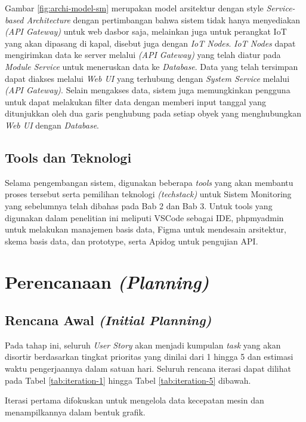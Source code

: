 Gambar \ref{fig:archi-model-sm} merupakan model arsitektur dengan style \textit{Service-based Architecture} dengan pertimbangan bahwa sistem tidak hanya menyediakan \textit{(API Gateway)} untuk web dasbor saja, melainkan juga untuk perangkat IoT yang akan dipasang di kapal, disebut juga dengan \textit{IoT Nodes}. \textit{IoT Nodes} dapat mengirimkan data ke server melalui \textit{(API Gateway)} yang telah diatur pada \textit{Module Service} untuk meneruskan data ke \textit{Database}. Data yang telah tersimpan dapat diakses melalui \textit{Web UI} yang terhubung dengan \textit{System Service} melalui \textit{(API Gateway)}. Selain mengakses data, sistem juga memungkinkan pengguna untuk dapat melakukan filter data dengan memberi input tanggal yang ditunjukkan oleh dua garis penghubung pada setiap obyek yang menghubungkan \textit{Web UI} dengan \textit{Database}.

\subsection{Tools dan Teknologi}

Selama pengembangan sistem, digunakan beberapa \textit{tools} yang akan membantu proses tersebut serta pemilihan teknologi \textit{(techstack)} untuk Sistem Monitoring yang sebelumnya telah dibahas pada Bab 2 dan Bab 3. Untuk tools yang digunakan dalam penelitian ini meliputi VSCode sebagai IDE, phpmyadmin untuk melakukan manajemen basis data, Figma untuk mendesain arsitektur, skema basis data, dan prototype, serta Apidog untuk pengujian API.

\section{Perencanaan \textit{(Planning)}}

\subsection{Rencana Awal \textit{(Initial Planning)}}

Pada tahap ini, seluruh \textit{User Story} akan menjadi kumpulan \textit{task} yang akan disortir berdasarkan tingkat prioritas yang dinilai dari 1 hingga 5 dan estimasi waktu pengerjaannya dalam satuan hari. Seluruh rencana iterasi dapat dilihat pada Tabel \ref{tab:iteration-1} hingga Tabel \ref{tab:iteration-5} dibawah.

Iterasi pertama difokuskan untuk mengelola data kecepatan mesin dan menampilkannya dalam bentuk grafik.

